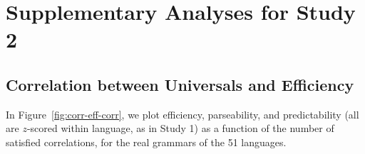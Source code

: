 \documentclass[10pt,twoside,lineno]{article}
\begin{document}
%
%
%
%
%
%
%
%



\section{Supplementary Analyses for Study 2}
\subsection{Correlation between Universals and Efficiency}

In Figure~\ref{fig:corr-eff-corr}, we plot efficiency, parseability, and predictability (all are $z$-scored within language, as in Study 1) as a function of the number of satisfied correlations, for the real grammars of the 51 languages.
\end{document}
